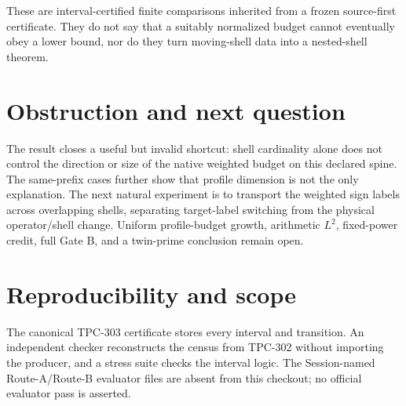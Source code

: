 \documentclass[11pt]{article}
\begin{document}
These are interval-certified finite comparisons inherited from a frozen
source-first certificate.  They do not say that a suitably normalized budget
cannot eventually obey a lower bound, nor do they turn moving-shell data into
a nested-shell theorem.

\section{Obstruction and next question}

The result closes a useful but invalid shortcut: shell cardinality alone does
not control the direction or size of the native weighted budget on this
declared spine.  The same-prefix cases further show that profile dimension is
not the only explanation.  The next natural experiment is to transport the
weighted sign labels across overlapping shells, separating target-label
switching from the physical operator/shell change.  Uniform profile-budget
growth, arithmetic $L^2$, fixed-power credit, full Gate B, and a twin-prime
conclusion remain open.

\section*{Reproducibility and scope}

The canonical TPC-303 certificate stores every interval and transition.  An
independent checker reconstructs the census from TPC-302 without importing
the producer, and a stress suite checks the interval logic.  The
Session-named Route-A/Route-B evaluator files are absent from this checkout;
no official evaluator pass is asserted.



\end{document}

